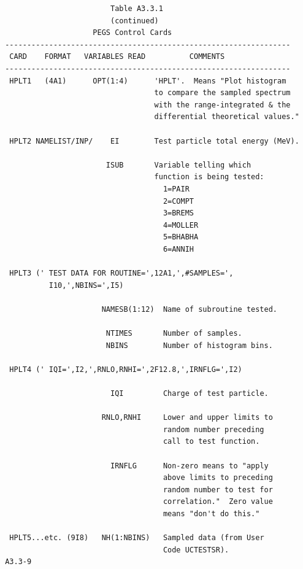 \newpage {} \begin{verbatim}
                         Table A3.3.1
                         (continued)
                     PEGS Control Cards
 -----------------------------------------------------------------
  CARD    FORMAT   VARIABLES READ          COMMENTS
 -----------------------------------------------------------------
  HPLT1   (4A1)      OPT(1:4)      'HPLT'.  Means "Plot histogram
                                   to compare the sampled spectrum
                                   with the range-integrated & the
                                   differential theoretical values."

  HPLT2 NAMELIST/INP/    EI        Test particle total energy (MeV).

                        ISUB       Variable telling which
                                   function is being tested:
                                     1=PAIR
                                     2=COMPT
                                     3=BREMS
                                     4=MOLLER
                                     5=BHABHA
                                     6=ANNIH

  HPLT3 (' TEST DATA FOR ROUTINE=',12A1,',#SAMPLES=',
           I10,',NBINS=',I5)

                       NAMESB(1:12)  Name of subroutine tested.

                        NTIMES       Number of samples.
                        NBINS        Number of histogram bins.

  HPLT4 (' IQI=',I2,',RNLO,RNHI=',2F12.8,',IRNFLG=',I2)

                         IQI         Charge of test particle.

                       RNLO,RNHI     Lower and upper limits to
                                     random number preceding
                                     call to test function.

                         IRNFLG      Non-zero means to "apply
                                     above limits to preceding
                                     random number to test for
                                     correlation."  Zero value
                                     means "don't do this."

  HPLT5...etc. (9I8)   NH(1:NBINS)   Sampled data (from User
                                     Code UCTESTSR).
 A3.3-9
\end{verbatim}

